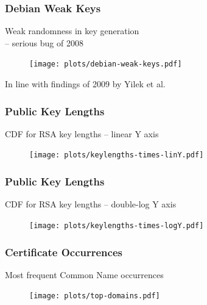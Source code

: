 \begin{frame}
  \frametitle{Debian Weak Keys}
  \begin{block}{Weak randomness in key generation \\-- serious bug of 2008}
    \begin{figure}
    \centering
     \texttt{[image: plots/debian-weak-keys.pdf]}
    \end{figure}
  \end{block}
  \begin{block}{In line with findings of 2009 by Yilek et al.}\end{block}
\end{frame}

\begin{frame}
  \frametitle{Public Key Lengths}
  \begin{block}{CDF for RSA key lengths -- linear Y axis}
    \begin{figure}
    \centering
     \texttt{[image: plots/keylengths-times-linY.pdf]}
    \end{figure}
  \end{block}
\end{frame}



\begin{frame}
  \frametitle{Public Key Lengths}
  \begin{block}{CDF for RSA key lengths -- double-log Y axis}
     \begin{figure}
    \centering
     \texttt{[image: plots/keylengths-times-logY.pdf]}
    \end{figure}
  \end{block}
\end{frame}



\begin{frame}
  \frametitle{Certificate Occurrences}
  \begin{block}{Most frequent Common Name occurrences}
    \begin{figure}
    \centering
      \texttt{[image: plots/top-domains.pdf]}
    \end{figure}
  \end{block}
\end{frame}



